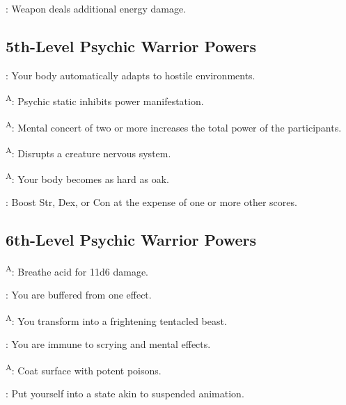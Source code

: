 : Weapon deals additional energy damage.




\subsection{5th-Level Psychic Warrior Powers}

: Your body automatically adapts to hostile environments.

\textsuperscript{A}: Psychic static inhibits power manifestation.

\textsuperscript{A}: Mental concert of two or more increases the total power of the participants.

\textsuperscript{A}: Disrupts a creature nervous system. %

\textsuperscript{A}: Your body becomes as hard as oak.

: Boost Str, Dex, or Con at the expense of one or more other scores.




\subsection{6th-Level Psychic Warrior Powers}

\textsuperscript{A}: Breathe acid for 11d6 damage.

: You are buffered from one  effect.

\textsuperscript{A}: You transform into a frightening tentacled beast.

: You are immune to scrying and mental effects.

\textsuperscript{A}: Coat surface with potent poisons. %

: Put yourself into a state akin to suspended animation.
